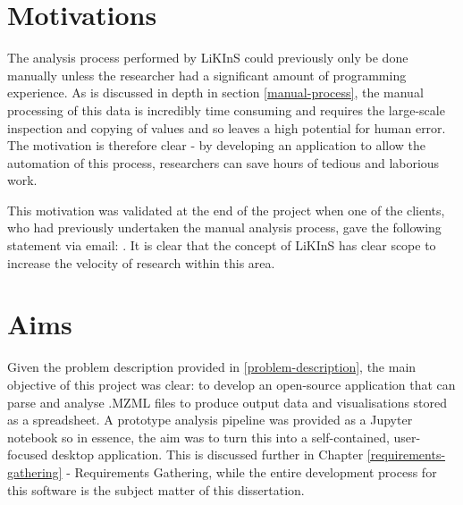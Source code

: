 \documentclass{l4proj}
\begin{document}
\section{Motivations}
The analysis process performed by LiKInS could previously only be done manually unless the researcher had a significant amount of programming experience. As is discussed in depth in section \ref{manual-process}, the manual processing of this data is incredibly time consuming and requires the large-scale inspection and copying of values and so leaves a high potential for human error. The motivation is therefore clear - by developing an application to allow the automation of this process, researchers can save hours of tedious and laborious work. 

This motivation was validated at the end of the project when one of the clients, who had previously undertaken the manual analysis process, gave the following statement via email: . It is clear that the concept of LiKInS has clear scope to increase the velocity of research within this area.

\section{Aims}
Given the problem description provided in \ref{problem-description}, the main objective of this project was clear: to develop an open-source application that can parse and analyse .MZML files to produce output data and visualisations stored as a spreadsheet. A prototype analysis pipeline was provided as a Jupyter notebook so in essence, the aim was to turn this into a self-contained, user-focused desktop application. This is discussed further in Chapter \ref{requirements-gathering} - Requirements Gathering, while the entire development process for this software is the subject matter of this dissertation.
\end{document}
